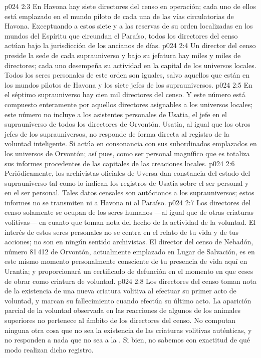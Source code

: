 \vs p024 2:3 \pc En Havona hay siete directores del censo en operación; cada uno de ellos está emplazado en el mundo piloto de cada una de las vías circulatorias de Havona. Exceptuando a estos siete y a las reservas de su orden localizadas en los mundos del Espíritu que circundan el Paraíso, todos los directores del censo actúan bajo la jurisdicción de los ancianos de días.
\vs p024 2:4 Un director del censo preside la sede de cada suprauniverso y bajo su jefatura hay miles y miles de directores; cada uno desempeña su actividad en la capital de los universos locales. Todos los seres personales de este orden son iguales, salvo aquellos que están en los mundos pilotos de Havona y los siete jefes de los suprauniversos.
\vs p024 2:5 En el séptimo suprauniverso hay cien mil directores del censo. Y este número está compuesto enteramente por aquellos directores asignables a los universos locales; este número no incluye a los asistentes personales de Usatia, el jefe en el suprauniverso de todos los directores de Orvontón. Usatia, al igual que los otros jefes de los suprauniversos, no responde de forma directa al registro de la voluntad inteligente. Si actúa en consonancia con sus subordinados emplazados en los universos de Orvontón; así pues, como ser personal magnífico que es totaliza sus informes procedentes de las capitales de las creaciones locales.
\vs p024 2:6 Periódicamente, los archivistas oficiales de Uversa dan constancia del estado del suprauniverso tal como lo indican los registros de Usatia sobre el ser personal y en el ser personal. Tales datos censales son autóctonos a los suprauniversos; estos informes no se transmiten ni a Havona ni al Paraíso.
\vs p024 2:7 \pc Los directores del censo solamente se ocupan de los seres humanos ---al igual que de otras criaturas volitivas--- en cuanto que toman nota del hecho de la actividad de la voluntad. El interés de estos seres personales no se centra en el relato de tu vida y de tus acciones; no son en ningún sentido archivistas. El director del censo de Nebadón, número 81\,412 de Orvontón, actualmente emplazado en Lugar de Salvación, es en este mismo momento personalmente consciente de tu presencia de vida aquí en Urantia; y proporcionará un certificado de defunción en el momento en que ceses de obrar como criatura de voluntad.
\vs p024 2:8 Los directores del censo toman nota de la existencia de una nueva criatura volitiva al efectuar su primer acto de voluntad, y marcan su fallecimiento cuando efectúa su último acto. La aparición parcial de la voluntad observada en las reacciones de algunos de los animales superiores no pertenece al ámbito de los directores del censo. No computan ninguna otra cosa que no sea la existencia de las criaturas volitivas auténticas, y no responden a nada que no sea a la . Si bien, no sabemos con exactitud de qué modo realizan dicho registro.
